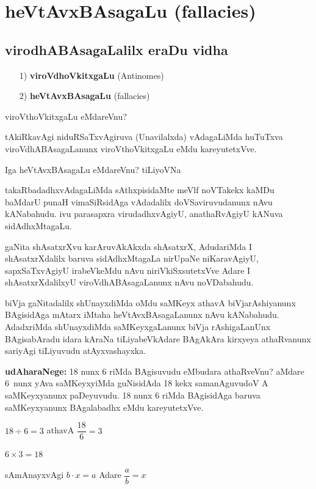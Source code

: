 \chapter{heVtAvxBAsagaLu {\rm (fallacies)}}

\section*{virodhABAsagaLalilx eraDu vidha}

\begin{itemize}
\item[{\rm 1)}] {\bf viroVdhoVkitxgaLu} {\rm (Antinomes)}
\item[{\rm 2)}] {\bf heVtAvxBAsagaLu} {\rm (fallacies)}
\end{itemize}

viroVthoVkitxgaLu eMdareVnu?

tAkiRkavAgi niduRSaTxvAgiruva (Unavilalxda) vAdagaLiMda huTuTxva viroVdhA\-BAsagaLanunx viroVthoVkitxgaLu eMdu kareyutetxVve.

Iga heVtAvxBAsagaLu eMdareVnu? tiLiyoVNa

takaRbadadhxvAdagaLiMda sAthxpisidaMte meVlf noVTakekx kaMDu baMdarU punaH vimaSiRsidAga vAdadalilx doVSaviruvudanunx nAvu kANabahudu. ivu parasapxra virudadhxvAgiyU, anathaRvAgiyU kANuva sidAdhxMtagaLu.

gaNita shAsatxrXvu karAruvAkAkxda shAsatxrX, AdudariMda I shAsatxrXdalilx baruva sidAdhxMta\-gaLa nirUpaNe niKaravAgiyU, sapxSaTxvAgiyU irabeVkeMdu nAvu niriVkiSxsutetxVve Adare I shAsatxrXdalilxyU viroVdhABAsagaLanunx nAvu noVDabahudu.

biVja gaNitadalilx shUnayxdiMda oMdu saMKeyx athavA biVjarAshiyanunx BAgisidAga mAtarx iMtaha heVtAvxBAsagaLanunx nAvu kANabahudu. AdadxriMda shUnayxdiMda saMKeyxgaLanunx biVja rAshigaLanUnx BAgisabAradu idara kAraNa tiLiyabeVkAdare BAgAkAra kirxyeya athaRvanunx sariyAgi tiLiyuvudu atAyxvashayxka.

\textbf{udAharaNege:} {\rm 18} nunx {\rm 6} riMda BAgisuvudu eMbudara athaRveVnu? aMdare {\rm 6}~nunx yAva saMKeyxyiMda guNisidAda {\rm 18} kekx samanAguvudoV A saMKeyxyanunx paDeyuvudu. {\rm 18} nunx {\rm 6} riMda BAgisidAga baruva saMKeyxyanunx BAgalabadhx eMdu kareyutetxVve.
\begin{center}
$18\div 6=3$ \quad athavA \quad $\dfrac{18}{6}=3$

$6\times3=18$

sAmAnayxvAgi \quad $b\cdot x=a$ \quad Adare \quad $\dfrac{a}{b}=x$
\end{center}

